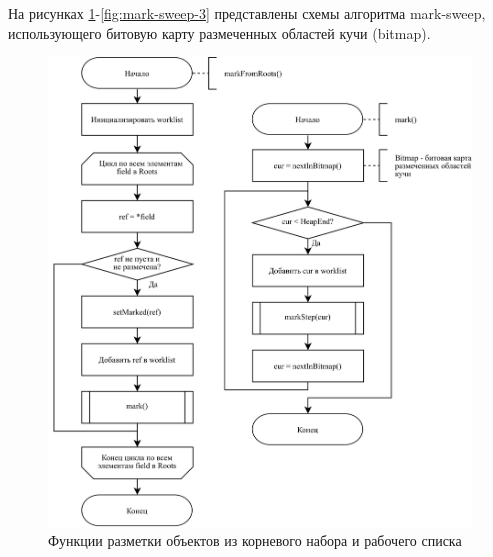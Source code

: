 На рисунках \ref{fig:mark-sweep-1}-\ref{fig:mark-sweep-3} представлены схемы алгоритма mark-sweep, использующего битовую карту размеченных областей кучи (bitmap). \cite{handbook}

\begin{figure}[H]
	\centering
	\includegraphics[scale=0.175]{assets/mark-sweep-1.png}
	\caption{Функции разметки объектов из корневого набора и рабочего списка}
	\label{fig:mark-sweep-1}
\end{figure}

